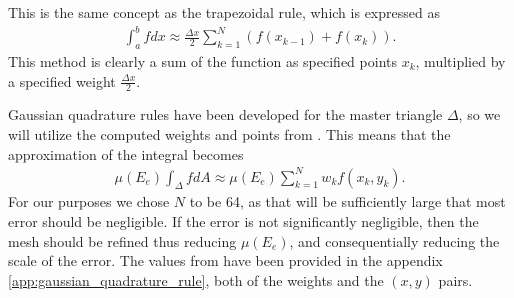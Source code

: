 \documentclass[../fem.tex]{subfile}
\begin{document}
This is the same concept as the trapezoidal rule, which is expressed as
\begin{align*}
  \int_a^bfdx\approx\frac{\Delta
    x}{2}\sum_{k=1}^{N}\left(f(x_{k-1})+f(x_{k})\right).
\end{align*}
This method is clearly a sum of the function as specified points $x_k$, multiplied by
a specified weight $\frac{\Delta x}{2}$.

Gaussian quadrature rules have been developed for the master triangle $\Delta$,
so we will utilize the computed weights and points from \cite{GQ}. This means
that the approximation of the integral becomes
\begin{align*}
  \mu\left(E_e\right)\int_{\Delta}fdA\approx\mu\left(E_e\right)\sum_{k=1}^Nw_kf(x_k,y_k).
\end{align*}
For our purposes we chose $N$ to be 64, as that will be sufficiently large that
most error should be negligible. If the error is not significantly negligible,
then the mesh should be refined thus reducing $\mu\left(E_e\right)$, and
consequentially reducing the scale of the error. The values from \cite{GQ} have
been provided in the appendix \ref{app:gaussian_quadrature_rule}, both of the
weights and the $(x,y)$ pairs.
\end{document}
